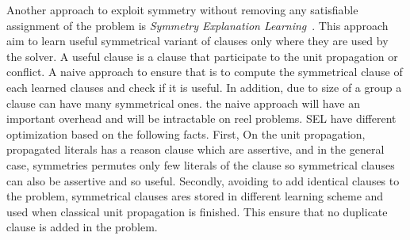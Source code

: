 Another approach to exploit symmetry without removing any satisfiable assignment of the problem
is \emph{Symmetry Explanation Learning}~\cite{devriendt2017symmetric}. This approach aim to learn useful 
symmetrical variant of clauses only where they are used by the solver. A useful clause is a clause that participate
to the unit propagation or conflict. 
A naive approach to ensure that is to compute the symmetrical clause of 
each learned clauses and check if it is useful. In addition, due to size of a group a clause can have many 
symmetrical ones. the naive approach will have an important overhead and will be intractable on reel problems.
SEL have different optimization based on the following facts. First,
On the unit propagation, propagated literals has a reason clause which are assertive, and in the general case,
 symmetries permutes only few literals of the clause so symmetrical clauses can also be assertive and so useful.
Secondly, avoiding to add identical clauses to the problem, symmetrical clauses ares stored in different learning scheme and used when classical unit propagation is finished. This ensure that no duplicate clause is added in the problem.
  

 





%



